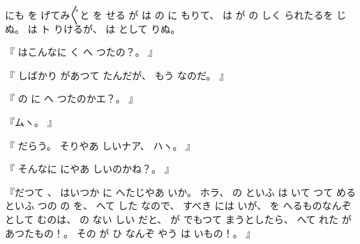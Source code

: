 にも
を
げてみ〴〵と
を
せる
が
は
の
に
もりて、
%
は
が
の
しく
られたるを
じぬ。
%
は
ト
りけるが、
%
は
として
りぬ。

『
はこんなに
く
へ
つたの？。
』

『
しばかり
があつて
たんだが、
%
もう
なのだ。
』

『
の
に
へ
つたのかエ？。
』

『ムヽ。
』

『
だらう。
%
そりやあ
しいナア、
%
ハヽ。
』

『
そんなに
にやあ
しいのかね？。
』

『だつて
、
%
はいつか
に
へたじやあ
いか。
%
ホラ、
%
の
といふ
は
いて
つて
めるといふ
つの
の
を、
%
へて
した
なので、
%
すべき
には
いが、
%
を
へるものなんぞとして
むのは、
%
の
ない
しい
だと、
%
が
でもつて
まうとしたら、
%
へて
れた
があつたもの！。
%
その
が
ひ
なんぞ
やう
は
いもの！。
』

